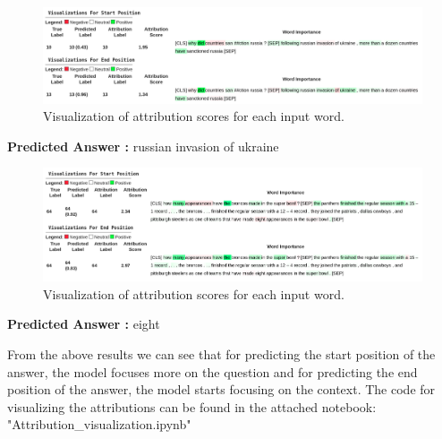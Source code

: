 \documentclass[10pt,twocolumn,letterpaper]{article}
\begin{document}
\begin{figure}[h]
    \centering
    \onecolumn\includegraphics[width=\textwidth]{1.png}
    \caption{Visualization of attribution scores for each input word.}
    \label{fig:my_label}
\end{figure}


\centerline{\textbf{Predicted Answer :} russian invasion of ukraine}


\begin{figure}[ht]
    \centering
    \includegraphics[width=\textwidth]{2.png}
    \caption{Visualization of attribution scores for each input word.}
    \label{fig:my_label}
\end{figure}
\centerline{\textbf{Predicted Answer :} eight }
\twocolumn
From the above results we can see that for predicting the start position of the answer, the model focuses more on the question and for predicting the end position of the answer, the model starts focusing on the context. The code for visualizing the attributions can be found in the attached notebook: "Attribution\_visualization.ipynb"

{\small


}
\end{document}
